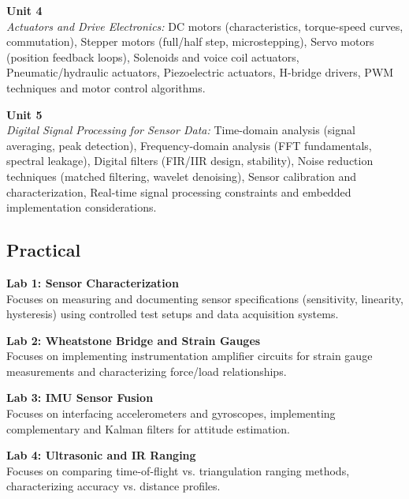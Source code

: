 \noindent\textbf{Unit 4} \\
\textit{Actuators and Drive Electronics:} DC motors (characteristics, torque-speed curves, commutation), Stepper motors (full/half step, microstepping), Servo motors (position feedback loops), Solenoids and voice coil actuators, Pneumatic/hydraulic actuators, Piezoelectric actuators, H-bridge drivers, PWM techniques and motor control algorithms.

\vspace{0.3cm}

\noindent\textbf{Unit 5} \\
\textit{Digital Signal Processing for Sensor Data:} Time-domain analysis (signal averaging, peak detection), Frequency-domain analysis (FFT fundamentals, spectral leakage), Digital filters (FIR/IIR design, stability), Noise reduction techniques (matched filtering, wavelet denoising), Sensor calibration and characterization, Real-time signal processing constraints and embedded implementation considerations.

\newpage

\subsection*{Practical}
\noindent\textbf{Lab 1: Sensor Characterization} \\
Focuses on measuring and documenting sensor specifications (sensitivity, linearity, hysteresis) using controlled test setups and data acquisition systems.

\vspace{0.2cm}

\noindent\textbf{Lab 2: Wheatstone Bridge and Strain Gauges} \\
Focuses on implementing instrumentation amplifier circuits for strain gauge measurements and characterizing force/load relationships.

\vspace{0.2cm}

\noindent\textbf{Lab 3: IMU Sensor Fusion} \\
Focuses on interfacing accelerometers and gyroscopes, implementing complementary and Kalman filters for attitude estimation.

\vspace{0.2cm}

\noindent\textbf{Lab 4: Ultrasonic and IR Ranging} \\
Focuses on comparing time-of-flight vs. triangulation ranging methods, characterizing accuracy vs. distance profiles.

